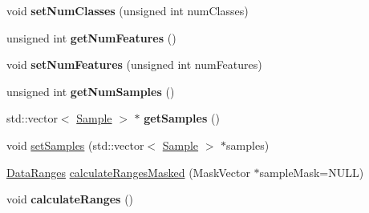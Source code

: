 \begin{DoxyCompactItemize}
\item 
\hypertarget{classffactory_1_1_dataset_ab850fb87df1ed9916b457cdb32cd1fef}{void {\bfseries set\-Num\-Classes} (unsigned int num\-Classes)}\label{classffactory_1_1_dataset_ab850fb87df1ed9916b457cdb32cd1fef}

\item 
\hypertarget{classffactory_1_1_dataset_ae7e0905c373e08b5ac4d0b6494116113}{unsigned int {\bfseries get\-Num\-Features} ()}\label{classffactory_1_1_dataset_ae7e0905c373e08b5ac4d0b6494116113}

\item 
\hypertarget{classffactory_1_1_dataset_adde747e1d56656c1ab69e74a99c9f5b3}{void {\bfseries set\-Num\-Features} (unsigned int num\-Features)}\label{classffactory_1_1_dataset_adde747e1d56656c1ab69e74a99c9f5b3}

\item 
\hypertarget{classffactory_1_1_dataset_a054cfd19c38faf3ecda47dc2856be301}{unsigned int {\bfseries get\-Num\-Samples} ()}\label{classffactory_1_1_dataset_a054cfd19c38faf3ecda47dc2856be301}

\item 
\hypertarget{classffactory_1_1_dataset_acc9e899186524016f4fc445496cc51e5}{std\-::vector$<$ \hyperlink{classffactory_1_1_sample}{Sample} $>$ $\ast$ {\bfseries get\-Samples} ()}\label{classffactory_1_1_dataset_acc9e899186524016f4fc445496cc51e5}

\item 
void \hyperlink{classffactory_1_1_dataset_ae11f7cb8026bcae1b7213c7e956799c0}{set\-Samples} (std\-::vector$<$ \hyperlink{classffactory_1_1_sample}{Sample} $>$ $\ast$samples)
\item 
\hyperlink{classffactory_1_1_data_ranges}{Data\-Ranges} \hyperlink{classffactory_1_1_dataset_a77c4ab02a3d3c479d0d3ae27543a3f8b}{calculate\-Ranges\-Masked} (Mask\-Vector $\ast$sample\-Mask=N\-U\-L\-L)
\item 
\hypertarget{classffactory_1_1_dataset_a6361c1633c343a831e859ab7b4276e50}{void {\bfseries calculate\-Ranges} ()}\label{classffactory_1_1_dataset_a6361c1633c343a831e859ab7b4276e50}


\end{DoxyCompactItemize}
